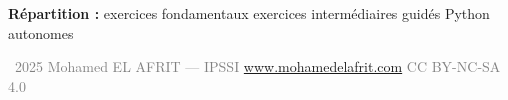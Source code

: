 \vfill
\separateur

\begin{center}
    \small\sffamily
    \textbf{R\'{e}partition :} exercices  fondamentaux  exercices  interm\'{e}diaires  guid\'{e}s Python   autonomes 
\end{center}

\begin{center}
    {\footnotesize\sffamily\textcolor{gray}{%
        \textcopyright\ 2025 Mohamed EL AFRIT --- IPSSI \enspace\textbullet\enspace
        \url{www.mohamedelafrit.com} \enspace\textbullet\enspace
        CC BY-NC-SA 4.0
    }}
\end{center}


